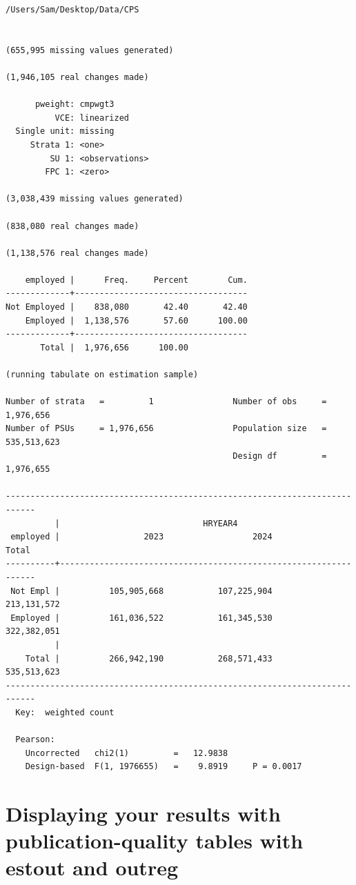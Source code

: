\documentclass[
]{book}
\begin{document}
\begin{verbatim}
/Users/Sam/Desktop/Data/CPS


(655,995 missing values generated)

(1,946,105 real changes made)

      pweight: cmpwgt3
          VCE: linearized
  Single unit: missing
     Strata 1: <one>
         SU 1: <observations>
        FPC 1: <zero>

(3,038,439 missing values generated)

(838,080 real changes made)

(1,138,576 real changes made)

    employed |      Freq.     Percent        Cum.
-------------+-----------------------------------
Not Employed |    838,080       42.40       42.40
    Employed |  1,138,576       57.60      100.00
-------------+-----------------------------------
       Total |  1,976,656      100.00

(running tabulate on estimation sample)

Number of strata   =         1                Number of obs     =    1,976,656
Number of PSUs     = 1,976,656                Population size   =  535,513,623
                                              Design df         =    1,976,655

----------------------------------------------------------------------------
          |                             HRYEAR4                             
 employed |                 2023                  2024                 Total
----------+-----------------------------------------------------------------
 Not Empl |          105,905,668           107,225,904           213,131,572
 Employed |          161,036,522           161,345,530           322,382,051
          | 
    Total |          266,942,190           268,571,433           535,513,623
----------------------------------------------------------------------------
  Key:  weighted count

  Pearson:
    Uncorrected   chi2(1)         =   12.9838
    Design-based  F(1, 1976655)   =    9.8919     P = 0.0017
\end{verbatim}

\chapter{Displaying your results with publication-quality tables with estout and outreg}\label{displaying-your-results-with-publication-quality-tables-with-estout-and-outreg}
\end{document}
